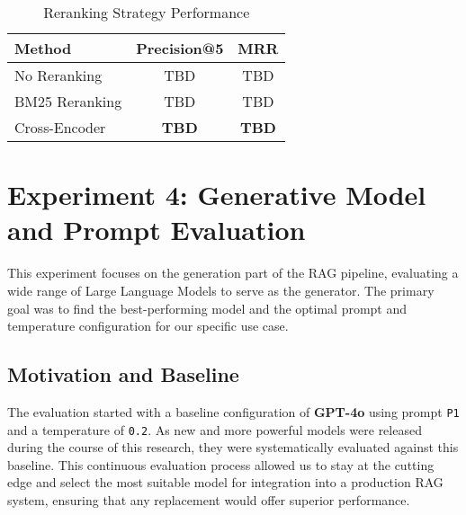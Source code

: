 \begin{table}[!htbp]
\centering
\caption{Reranking Strategy Performance}
\label{tab:reranking_results}
\begin{tabular}{|l|c|c|}
\hline
\textbf{Method} & \textbf{Precision@5} & \textbf{MRR} \\
\hline
No Reranking & TBD & TBD \\
BM25 Reranking & TBD & TBD \\
Cross-Encoder & \textbf{TBD} & \textbf{TBD} \\
\hline
\end{tabular}
\end{table}

\section{Experiment 4: Generative Model and Prompt Evaluation}
\label{sec:exp_generator_prompt}
This experiment focuses on the generation part of the RAG pipeline, evaluating a wide range of Large Language Models to serve as the generator. The primary goal was to find the best-performing model and the optimal prompt and temperature configuration for our specific use case.

\subsection{Motivation and Baseline}
The evaluation started with a baseline configuration of \textbf{GPT-4o} using prompt \texttt{P1} and a temperature of \texttt{0.2}. As new and more powerful models were released during the course of this research, they were systematically evaluated against this baseline. This continuous evaluation process allowed us to stay at the cutting edge and select the most suitable model for integration into a production RAG system, ensuring that any replacement would offer superior performance.

